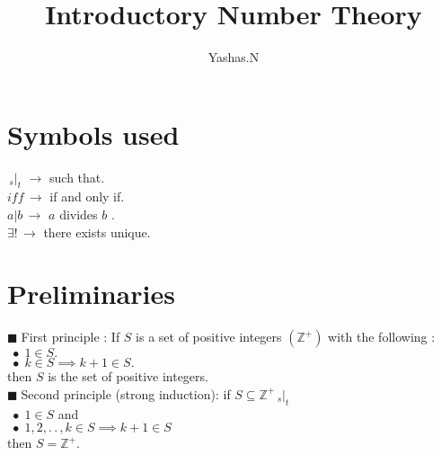 \documentclass[11pt]{extarticle}
\author{Yashas.N}
\title{Introductory Number Theory}
\date{}
\newcommand{\ra}{\rightarrow}
\newcommand{\Z}{\mathbb{Z}}
\newcommand{\ck}{.\,.\,}
\newcommand{\st}{\,{}_{s}|_t\,}
\newcommand{\tbx}[2][]{
\begin{tcolorbox}[enhanced,breakable,size=small,colback=black!2!white,title={#1},arc is angular, arc=1.5mm,
	drop fuzzy shadow]
	#2
\end{tcolorbox}
}
\newcommand{\y}{$\blacksquare\;$}
\newcommand{\yi}{\indent$\;\bullet\;$}
\begin{document}
\maketitle
\begin{multicols}{2}
	\tableofcontents
\section*{Symbols used}
	\begin{center}
	$ \st \, \ra  $ such that.\\
	$ iff\,\ra $ if and only if.\\
	$ a|b \, \ra  $ $ a $ divides $ b $ .\\
	$ \exists! \, \ra  $ there exists unique.\\
	
\end{center}
\newcolumn
\section{Preliminaries}
\tbx[Principle of Mathematical induction]{
\y First principle :  If $ S $ is a set of positive integers $ (\Z^+) $ with the following :\\
\yi $ 1\in S. $ \\
\yi $ k\in S \implies k+1\in S. $ \\
then $ S $ is the set of positive integers.\\
\y Second principle (strong induction): if $ S \subseteq \Z^+ \st $\\
\yi $ 1\in S $ and \\
\yi $ 1,2,\ck,k\in S  \implies k+1\in S$ \\
then $ S=\Z^+ .$  }

\end{multicols}
\end{document}
